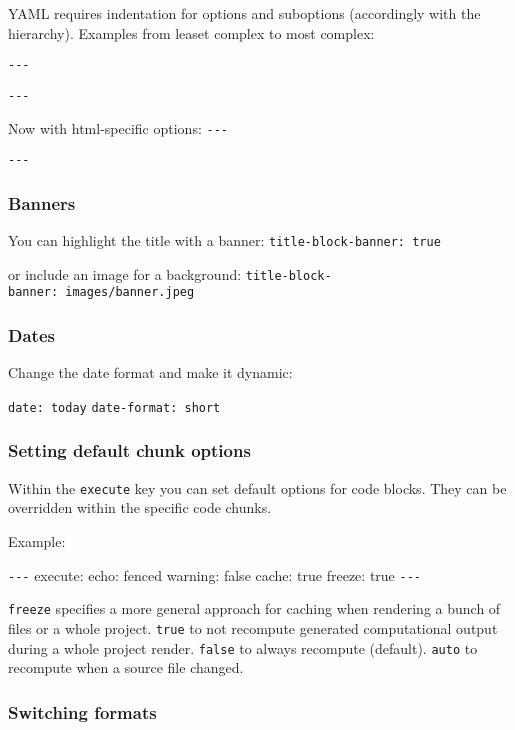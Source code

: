 \documentclass[
  letterpaper,
  DIV=11,
  numbers=noendperiod]{scrartcl}
\begin{document}
YAML requires indentation for options and suboptions (accordingly with
the hierarchy). Examples from leaset complex to most complex:

\texttt{-\/-\/-}

\texttt{-\/-\/-}

Now with html-specific options: \texttt{-\/-\/-}

\texttt{-\/-\/-}

\hypertarget{banners}{%
\subsubsection{Banners}\label{banners}}

You can highlight the title with a banner:
\texttt{title-block-banner:\ true}

or include an image for a background:
\texttt{title-block-banner:\ images/banner.jpeg}

\hypertarget{dates}{%
\subsubsection{Dates}\label{dates}}

Change the date format and make it dynamic:

\texttt{date:\ today} \texttt{date-format:\ short}

\hypertarget{setting-default-chunk-options}{%
\subsubsection{Setting default chunk
options}\label{setting-default-chunk-options}}

Within the \texttt{execute} key you can set default options for code
blocks. They can be overridden within the specific code chunks.

Example:

\texttt{-\/-\/-} execute: echo: fenced warning: false cache: true
freeze: true \texttt{-\/-\/-}

\texttt{freeze} specifies a more general approach for caching when
rendering a bunch of files or a whole project. \texttt{true} to not
recompute generated computational output during a whole project render.
\texttt{false} to always recompute (default). \texttt{auto} to recompute
when a source file changed.

\hypertarget{switching-formats}{%
\subsubsection{Switching formats}\label{switching-formats}}
\end{document}
